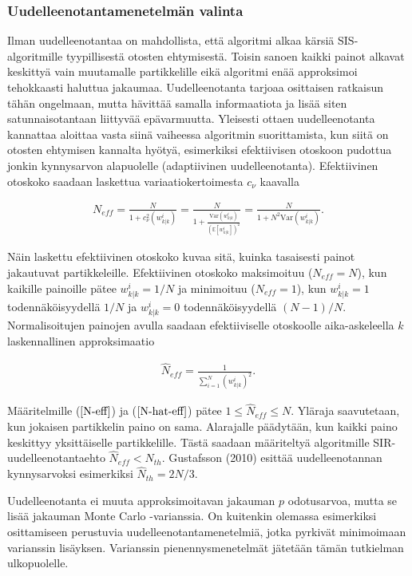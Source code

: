 \documentclass[
  12pt,
  a4paper, twoside]{book}
\begin{document}
\subsubsection{Uudelleenotantamenetelmän valinta} \label{uudelleenotantamenetelman-valinta}

Ilman uudelleenotantaa on mahdollista, että algoritmi alkaa kärsiä SIS-algoritmille tyypillisestä otosten ehtymisestä. Toisin sanoen kaikki painot alkavat keskittyä vain muutamalle partikkelille eikä algoritmi enää approksimoi tehokkaasti haluttua jakaumaa. Uudelleenotanta tarjoaa osittaisen ratkaisun tähän ongelmaan, mutta hävittää samalla informaatiota ja lisää siten satunnaisotantaan liittyvää epävarmuutta. Yleisesti ottaen uudelleenotanta kannattaa aloittaa vasta siinä vaiheessa algoritmin suorittamista, kun siitä on otosten ehtymisen kannalta hyötyä, esimerkiksi efektiivisen otoskoon pudottua jonkin kynnysarvon alapuolelle (adaptiivinen uudelleenotanta). Efektiivinen otoskoko saadaan laskettua variaatiokertoimesta \(c_\nu\) kaavalla

\begin{align}\label{N-eff}
N_{eff}= \frac{N}{1+c_\nu^2(w^i_{k|k})} = \frac{N}{1+\frac{\text{Var}(w^i_{k|k})}{(\mathbb{E}[w^i_{k|k}])^2}} =\frac{N}{1+N^2\text{Var}(w^i_{k|k})}.
\end{align}

Näin laskettu efektiivinen otoskoko kuvaa sitä, kuinka tasaisesti painot jakautuvat partikkeleille. Efektiivinen otoskoko maksimoituu (\(N_{eff}=N\)), kun kaikille painoille pätee \(w^i_{k|k}=1/N\) ja minimoituu (\(N_{eff}=1\)), kun \(w^i_{k|k}=1\) todennäköisyydellä \(1/N\) ja \(w^i_{k|k}=0\) todennäköisyydellä \((N-1)/N\). Normalisoitujen painojen avulla saadaan efektiiviselle otoskoolle aika-askeleella \(k\) laskennallinen approksimaatio

\begin{align}\label{N-hat-eff}
\hat{N}_{eff}=\frac{1}{\sum_{i=1}^N(w^i_{k|k})^2}.
\end{align}

Määritelmille (\(\ref{N-eff}\)) ja (\(\ref{N-hat-eff}\)) pätee \(1 \leq \hat{N}_{eff} \leq N\). Yläraja saavutetaan, kun jokaisen partikkelin paino on sama. Alarajalle päädytään, kun kaikki paino keskittyy yksittäiselle partikkelille. Tästä saadaan määriteltyä algoritmille SIR-uudelleenotantaehto \(\hat{N}_{eff}< N_{th}\). Gustafsson (2010) \citep{gustafsson-2010} esittää uudelleenotannan kynnysarvoksi esimerkiksi \(\hat{N}_{th}=2N/3\).

Uudelleenotanta ei muuta approksimoitavan jakauman \(p\) odotusarvoa, mutta se lisää jakauman Monte Carlo -varianssia. On kuitenkin olemassa esimerkiksi osittamiseen perustuvia uudelleenotantamenetelmiä, jotka pyrkivät minimoimaan varianssin lisäyksen. Varianssin pienennysmenetelmät jätetään tämän tutkielman ulkopuolelle.
\end{document}
